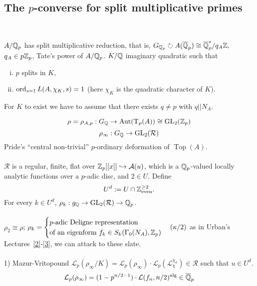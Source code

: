 \documentclass[12pt,amsfont]{amsart}
\begin{document}
\subsection{The $p$-converse for split multiplicative primes}
{\ }

$A/{\mathbb Q}_p$ has split multiplicative reduction, that is, $G_{{\mathbb Q}_p} \circlearrowright A(\overline{{\mathbb Q}}_p) \cong \overline{{\mathbb Q}}_p^\ast / q_A{{\mathbb Z}},$ $q_A \in p {\mathbb Z}_p$, Tate's power of $A/{\mathbb Q}_p$. $K/{\mathbb Q}$ imaginary quadratic such that 
\begin{enumerate}[(i)]
\item
$p$ splits in $K$, 
\item
$\operatorname{ord}_{s=1} L(A, \chi_K, s) = 1$ (here $\chi_K$ is the quadratic character of $K$). 
\end{enumerate}
\begin{rmk} For $K$ to exist we have to assume that there exists $q \ne p$ with $q || N_A$. 
\end{rmk}

\[\rho = \rho_{A,p} : G_{\mathbb Q} \rightarrow \operatorname{Aut}(\operatorname{T}_p(A)) \cong \operatorname{GL}_2({\mathbb Z}_p)\]
\[\rho_\infty : G_{\mathbb Q} \rightarrow \operatorname{GL}_2(\mathcal{R})\]
Pride's ``central non-trivial'' $p$-ordinary deformation of $\operatorname{Top}(A)$. \\ \\
$\mathcal{R}$ is a regular, finite, flat over ${\mathbb Z}_p[[x]] \hookrightarrow \mathcal{A}(u)$, which is a ${\mathbb Q}_p$-valued locally analytic functions over a $p$-adic disc, and $2 \in U$. 
Define
\[
U^d: = \displaystyle U \cap {\mathbb Z}_{\text{even}}^{\geq 2}.
\]
For every $k \in U^d$, $\rho_k : g_{\mathbb Q} \rightarrow \operatorname{GL}_2(\mathcal{R}) \rightarrow {\mathbb Q}_p$. \\ \\
$\rho_2 \cong \rho$; $\rho_k = \begin{cases} p\text{-adic Deligne representation} \\ \text{of an eigenform } f_k \in S_k(\Gamma_0(N_A), {\mathbb Z}_p) \end{cases}(\kappa/2)$ as in Urban's Lectures~\ref{2}-\ref{3}, we can attack to these slate. \\ \\
1) Mazur-Vritopound  $\mathcal{L}_p(\rho_\infty / K) = \mathcal{L}_p(\rho_\infty) \cdot \mathcal{L}_p(\mathcal{L}_\chi^{\chi_k}) \in \mathcal{R}$ such that $u \in U^d$.
\[\mathcal{L}_p(\rho_\infty) = (1 - p^{n/2 - 1}) \cdot \mathcal{L}(f_n, n/2)^{\text{alg}} \in \overline{{\mathbb Q}}_p\]
\end{document}

